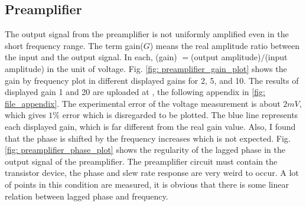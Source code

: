 \documentclass{article}
\begin{document}
\subsection{Preamplifier}
 The output signal from the preamplifier is not uniformly amplified even in the short frequency range.
 The term gain($G$) means the real amplitude ratio between the input and the output signal.
 In each, (gain) $=$(output amplitude)$/$(input amplitude) in the unit of voltage.
 Fig. \ref{fig: preamplifier_gain_plot} shows the gain by frequency plot in different displayed gains for 2, 5, and 10.
 The results of displayed gain 1 and 20 are uploaded at \cite{github}, the following appendix in \ref{fig: file_appendix}.
 The experimental error of the voltage measurement is about $2mV$, which gives $1\%$ error which is disregarded to be plotted.
 The blue line represents each displayed gain, which is far different from the real gain value.
 Also, I found that the phase is shifted by the frequency increases which is not expected.
 Fig. \ref{fig: preamplifier_phase_plot} shows the regularity of the lagged phase in the output signal of the preamplifier.
 The preamplifier circuit must contain the transistor device, the phase and slew rate response are very weird to occur.
 A lot of points in this condition are measured, it is obvious that there is some linear relation between lagged phase and frequency.
\end{document}
